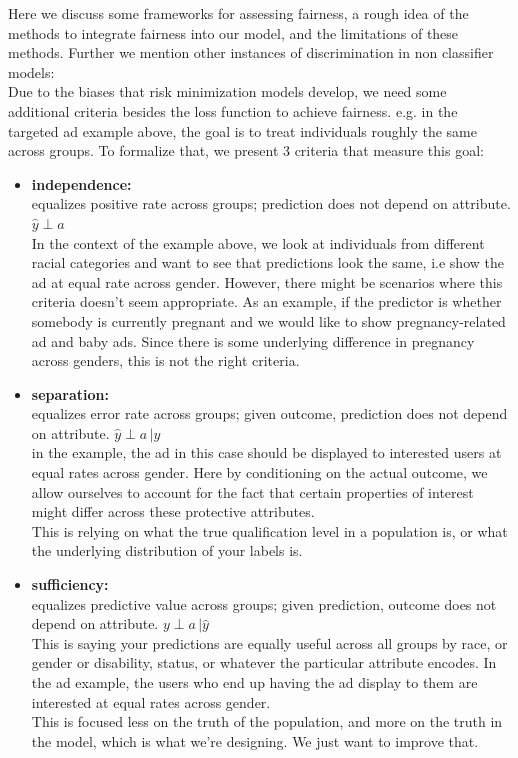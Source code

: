 Here we discuss some frameworks for assessing fairness, a rough idea of the methods to integrate fairness into our model, and the limitations of these methods. Further we mention other instances of discrimination in non classifier models:\\
Due to the biases that risk minimization models develop, we need some additional criteria besides the loss function to achieve fairness. e.g. in the targeted ad example above, the goal is to treat individuals roughly the same across groups. To formalize that, we present 3 criteria that measure this goal:
\begin{itemize}
    \item \textbf{independence:}\\ equalizes positive rate across groups; prediction does not depend on attribute. $\hat{y} \perp a$\\
In the context of the example above, we look at individuals from different racial categories and want to see that predictions look the same, i.e show the ad at equal rate across gender. However, there might be scenarios where this criteria doesn't seem appropriate. As an example, if the predictor is whether somebody is currently pregnant and we would like to show pregnancy-related ad and baby ads. Since there is some underlying difference in pregnancy across genders, this is not the right criteria.
    \item \textbf{separation:}\\ equalizes error rate across groups; given outcome, prediction does not depend on attribute. $\hat{y}\perp a\, \vert y$\\
    in the example, the ad in this case should be displayed to interested users at equal rates across gender. Here by conditioning on the actual outcome, we allow ourselves to account for the fact that certain properties of interest might differ across these protective attributes.\\
    This is relying on what the true qualification level in a population is, or what the underlying distribution of your labels is.
    \item \textbf{sufficiency:}\\ equalizes predictive value across groups; given prediction, outcome does not depend on attribute. $y\perp a\, \vert \hat{y}$\\
    This is saying your predictions are equally useful across all groups by race, or gender or disability, status, or whatever the particular attribute encodes. In the ad example, the users who end up having the ad display to them are interested at equal rates across gender.\\
    This is focused less on the truth of the population, and more on the truth in the model, which is what we're designing. We just want to improve that.
\end{itemize}
